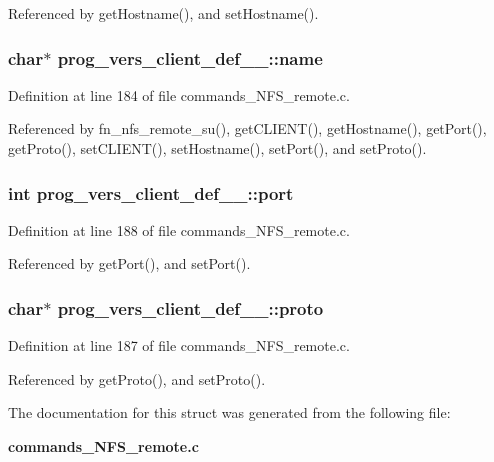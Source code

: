 Referenced by get\-Hostname(), and set\-Hostname().
\subsubsection{\setlength{\rightskip}{0pt plus 5cm}char$\ast$ {\bf prog\_\-vers\_\-client\_\-def\_\-\_\-::name}}\label{structprog__vers__client__def_____o0}




Definition at line 184 of file commands\_\-NFS\_\-remote.c.

Referenced by fn\_\-nfs\_\-remote\_\-su(), get\-CLIENT(), get\-Hostname(), get\-Port(), get\-Proto(), set\-CLIENT(), set\-Hostname(), set\-Port(), and set\-Proto().
\subsubsection{\setlength{\rightskip}{0pt plus 5cm}int {\bf prog\_\-vers\_\-client\_\-def\_\-\_\-::port}}\label{structprog__vers__client__def_____o4}




Definition at line 188 of file commands\_\-NFS\_\-remote.c.

Referenced by get\-Port(), and set\-Port().
\subsubsection{\setlength{\rightskip}{0pt plus 5cm}char$\ast$ {\bf prog\_\-vers\_\-client\_\-def\_\-\_\-::proto}}\label{structprog__vers__client__def_____o3}




Definition at line 187 of file commands\_\-NFS\_\-remote.c.

Referenced by get\-Proto(), and set\-Proto().

The documentation for this struct was generated from the following file:\begin{CompactItemize}
\item 
{\bf commands\_\-NFS\_\-remote.c}\end{CompactItemize}
